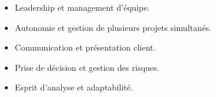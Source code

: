 \documentclass[10pt,a4paper,withhyper]{altacv}
\begin{document}
\begin{paracol}{2}



\switchcolumn


\begin{itemize}
	\item Leadership et management d'équipe.
	\item Autonomie et gestion de plusieurs projets simultanés.
	\item Communication et présentation client.
	\item Prise de décision et gestion des risques.
	\item Esprit d’analyse et adaptabilité.
\end{itemize}








\end{paracol}
\end{document}
